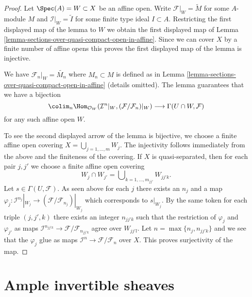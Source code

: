 \begin{proof}
Let $\Spec(A) = W \subset X$ be an affine open. Write
$\mathcal{F}|_W = \widetilde{M}$ for some $A$-module $M$
and $\mathcal{I}|_W = \widetilde{I}$ for some finite type
ideal $I \subset A$. Restricting the first displayed map
of the lemma to $W$ we obtain the first displayed map of
Lemma \ref{lemma-sections-over-quasi-compact-open-in-affine}.
Since we can cover $X$ by a finite number of affine opens this
proves the first displayed map of the lemma is injective.

\medskip\noindent
We have $\mathcal{F}_n|_W = \widetilde{M_n}$ where
$M_n \subset M$ is defined as in
Lemma \ref{lemma-sections-over-quasi-compact-open-in-affine}
(details omitted). The lemma guarantees that we have a bijection
$$
\colim_n  \Hom_{\mathcal{O}_W}(
\mathcal{I}^n|_W, (\mathcal{F}/\mathcal{F}_n)|_W)
\longrightarrow
\Gamma(U \cap W, \mathcal{F})
$$
for any such affine open $W$.

\medskip\noindent
To see the second displayed arrow of the lemma is bijective,
we choose a finite affine open covering $X = \bigcup_{j = 1, \ldots, m} W_j$.
The injectivity follows immediately from the above and the finiteness of
the covering. If $X$ is quasi-separated, then for each pair
$j, j'$ we choose a finite affine open covering
$$
W_j \cap W_{j'} = \bigcup\nolimits_{k = 1, \ldots, m_{jj'}} W_{jj'k}.
$$
Let $s \in \Gamma(U, \mathcal{F})$. As seen above for each $j$ there exists
an $n_j$ and a map
$\varphi_j : \mathcal{I}^{n_j}|_{W_j} \to
(\mathcal{F}/\mathcal{F}_{n_j})|_{W_j}$
which corresponds to $s|_{W_j}$.
By the same token for each triple $(j, j', k)$ there exists an integer
$n_{jj'k}$ such that the restriction of $\varphi_j$ and $\varphi_{j'}$
as maps $\mathcal{I}^{n_{jj'k}} \to \mathcal{F}/\mathcal{F}_{n_{jj'k}}$
agree over $W_{jj'l}$. Let $n = \max\{n_j, n_{jj'k}\}$ and we see that
the $\varphi_j$ glue as maps
$\mathcal{I}^n \to \mathcal{F}/\mathcal{F}_n$ over $X$.
This proves surjectivity of the map.
\end{proof}













\section{Ample invertible sheaves}
\label{section-ample}

